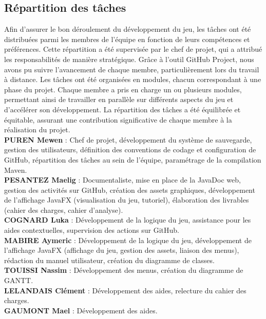 \subsection{Répartition des tâches}

Afin d'assurer le bon déroulement du développement du jeu, les tâches ont été distribuées parmi les membres de l'équipe en fonction de leurs compétences et préférences. Cette répartition a été supervisée par le chef de projet, qui a attribué les responsabilités de manière stratégique. Grâce à l'outil GitHub Project, nous avons pu suivre l'avancement de chaque membre, particulièrement lors du travail à distance. Les tâches ont été organisées en modules, chacun correspondant à une phase du projet. Chaque membre a pris en charge un ou plusieurs modules, permettant ainsi de travailler en parallèle sur différents aspects du jeu et d'accélérer son développement. La répartition des tâches a été équilibrée et équitable, assurant une contribution significative de chaque membre à la réalisation du projet. \\

\textbf{PUREN Mewen} : Chef de projet, développement du système de sauvegarde, gestion des utilisateurs, définition des conventions de codage et configuration de GitHub, répartition des tâches au sein de l’équipe, paramétrage de la compilation Maven. \\

\textbf{PESANTEZ Maelig} : Documentaliste, mise en place de la JavaDoc web, gestion des activités sur GitHub, création des assets graphiques, développement de l’affichage JavaFX (visualisation du jeu, tutoriel), élaboration des livrables (cahier des charges, cahier d’analyse). \\

\textbf{COGNARD Luka} : Développement de la logique du jeu, assistance pour les aides contextuelles, supervision des actions sur GitHub. \\

\textbf{MABIRE Aymeric} : Développement de la logique du jeu, développement de l’affichage JavaFX (affichage du jeu, gestion des assets, liaison des menus), rédaction du manuel utilisateur, création du diagramme de classes. \\

\textbf{TOUISSI Nassim} : Développement des menus, création du diagramme de GANTT. \\

\textbf{LELANDAIS Clément} : Développement des aides, relecture du cahier des charges. \\

\textbf{GAUMONT Mael} : Développement des aides.